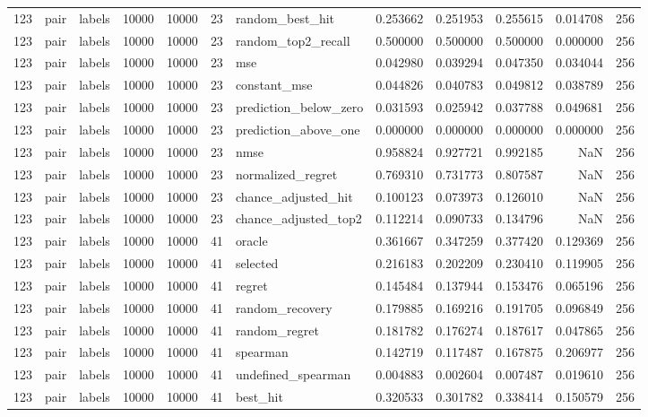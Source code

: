 \begin{tabular}{rllrrrlrrrrr}
123 & pair & labels & 10000 & 10000 & 23 & random_best_hit & 0.253662 & 0.251953 & 0.255615 & 0.014708 & 256 \\
123 & pair & labels & 10000 & 10000 & 23 & random_top2_recall & 0.500000 & 0.500000 & 0.500000 & 0.000000 & 256 \\
123 & pair & labels & 10000 & 10000 & 23 & mse & 0.042980 & 0.039294 & 0.047350 & 0.034044 & 256 \\
123 & pair & labels & 10000 & 10000 & 23 & constant_mse & 0.044826 & 0.040783 & 0.049812 & 0.038789 & 256 \\
123 & pair & labels & 10000 & 10000 & 23 & prediction_below_zero & 0.031593 & 0.025942 & 0.037788 & 0.049681 & 256 \\
123 & pair & labels & 10000 & 10000 & 23 & prediction_above_one & 0.000000 & 0.000000 & 0.000000 & 0.000000 & 256 \\
123 & pair & labels & 10000 & 10000 & 23 & nmse & 0.958824 & 0.927721 & 0.992185 & NaN & 256 \\
123 & pair & labels & 10000 & 10000 & 23 & normalized_regret & 0.769310 & 0.731773 & 0.807587 & NaN & 256 \\
123 & pair & labels & 10000 & 10000 & 23 & chance_adjusted_hit & 0.100123 & 0.073973 & 0.126010 & NaN & 256 \\
123 & pair & labels & 10000 & 10000 & 23 & chance_adjusted_top2 & 0.112214 & 0.090733 & 0.134796 & NaN & 256 \\
123 & pair & labels & 10000 & 10000 & 41 & oracle & 0.361667 & 0.347259 & 0.377420 & 0.129369 & 256 \\
123 & pair & labels & 10000 & 10000 & 41 & selected & 0.216183 & 0.202209 & 0.230410 & 0.119905 & 256 \\
123 & pair & labels & 10000 & 10000 & 41 & regret & 0.145484 & 0.137944 & 0.153476 & 0.065196 & 256 \\
123 & pair & labels & 10000 & 10000 & 41 & random_recovery & 0.179885 & 0.169216 & 0.191705 & 0.096849 & 256 \\
123 & pair & labels & 10000 & 10000 & 41 & random_regret & 0.181782 & 0.176274 & 0.187617 & 0.047865 & 256 \\
123 & pair & labels & 10000 & 10000 & 41 & spearman & 0.142719 & 0.117487 & 0.167875 & 0.206977 & 256 \\
123 & pair & labels & 10000 & 10000 & 41 & undefined_spearman & 0.004883 & 0.002604 & 0.007487 & 0.019610 & 256 \\
123 & pair & labels & 10000 & 10000 & 41 & best_hit & 0.320533 & 0.301782 & 0.338414 & 0.150579 & 256 \\

\end{tabular}
